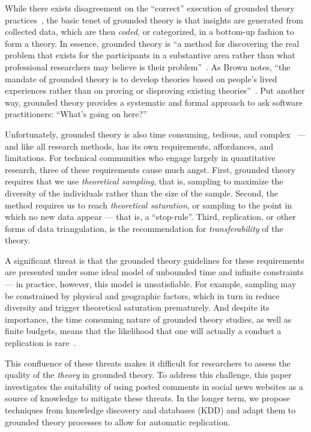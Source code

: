 \documentclass{sig-alternate}
\begin{document}
While there exists disagreement on the ``correct'' execution of grounded theory practices~\cite{Suddaby2006}, the basic tenet of grounded theory is that insights are generated from collected data, which are then \textit{coded}, or categorized, in a bottom-up fashion to form a theory. In essence, grounded theory is ``a method for discovering the real problem that exists for the participants in a substantive area rather than what professional researchers may believe is their problem''~\cite{Adolph2008}. As Brown notes, ``the mandate of grounded theory is to develop theories based on people's lived experiences rather than on proving or disproving existing theories''~\cite{brown2012daring}. Put another way, grounded theory provides a systematic and formal approach to ask software practitioners: ``What's going on here?''

Unfortunately, grounded theory is also time consuming, tedious, and complex~\cite{Olson2014} --- and like all research methods, has its own requirements, affordances, and limitations. For technical communities who engage largely in quantitative research, three of these requirements cause much angst. First, grounded theory requires that we use \textit{theoretical sampling}, that is, sampling to maximize the diversity of the individuals rather than the size of the sample. Second, the method requires us to reach \textit{theoretical saturation}, or sampling to the point in which no new data appear --- that is, a ``stop-rule''. Third, replication, or other forms of data triangulation, is the recommendation for \textit{transferability} of the theory.

A significant threat is that the grounded theory guidelines for these requirements are presented under some ideal model of unbounded time and infinite constraints --- in practice, however, this model is unsatisfiable. For example, sampling may be constrained by physical and geographic factors, which in turn in reduce diversity and trigger theoretical saturation prematurely. And despite its importance, the time consuming nature of grounded theory studies, as well as finite budgets, means that the likelihood that one will actually a conduct a replication is rare~\cite{Shull2008b}.

This confluence of these threats makes it difficult for researchers to assess the quality of the \textit{theory} in grounded theory. To address this challenge, this paper investigates the suitability of using posted comments in social news websites as a source of knowledge to mitigate these threats. In the longer term, we propose techniques from knowledge discovery and databases (KDD) and adapt them to grounded theory processes to allow for automatic replication.
\end{document}
